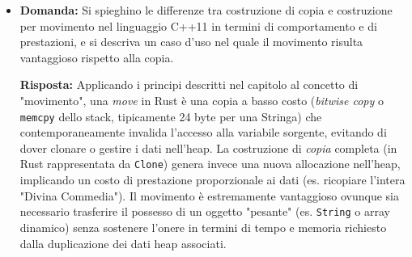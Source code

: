 \begin{itemize}
\begin{exambox}
    \textbf{Risposta:} L'\emph{ownership} stabilisce che ogni valore ha uno e un solo proprietario, responsabile della sua deallocazione (\texttt{Drop}). Questo previene problemi come \emph{double free} perché solo l'owner rilascia la risorsa. Nel concedere accessi temporanei (\emph{borrowing}), il compilatore verifica che una reference non viva più a lungo del suo proprietario (\emph{lifetime core rule}), eliminando alla radice i \emph{dangling pointer}. Le \emph{race condition} sono prevenute dalla rigida regola dei Readers-Writer: a compile-time non è possibile avere referenze mutabili (\texttt{\&mut T}) contemporaneamente ad altre referenze alla stessa memoria, garantendo stabilità dei dati.
    \end{exambox}

    \item \begin{exambox}
    \textbf{Domanda:} Si spieghino le differenze tra costruzione di copia e costruzione per movimento nel linguaggio C++11 in termini di comportamento e di prestazioni, e si descriva un caso d'uso nel quale il movimento risulta vantaggioso rispetto alla copia.
    
    \textbf{Risposta:} Applicando i principi descritti nel capitolo al concetto di "movimento", una \emph{move} in Rust è una copia a basso costo (\emph{bitwise copy} o \texttt{memcpy} dello stack, tipicamente 24 byte per una Stringa) che contemporaneamente invalida l'accesso alla variabile sorgente, evitando di dover clonare o gestire i dati nell'heap. La costruzione di \emph{copia} completa (in Rust rappresentata da \texttt{Clone}) genera invece una nuova allocazione nell'heap, implicando un costo di prestazione proporzionale ai dati (es. ricopiare l'intera "Divina Commedia"). Il movimento è estremamente vantaggioso ovunque sia necessario trasferire il possesso di un oggetto "pesante" (es. \texttt{String} o array dinamico) senza sostenere l'onere in termini di tempo e memoria richiesto dalla duplicazione dei dati heap associati.
    \end{exambox}
\end{itemize}
